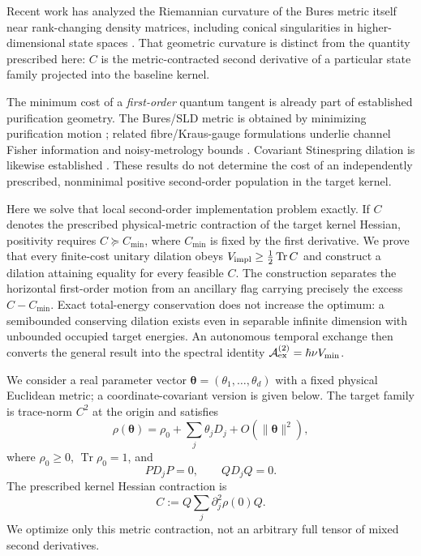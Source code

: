 \documentclass[aps,pra,preprint,nofootinbib]{revtex4-2}
\newcommand{\Tr}{\operatorname{Tr}}
\newcommand{\rhozero}{\rho_0}
\newcommand{\Cker}{C}
\begin{document}
Recent work has analyzed the Riemannian curvature of the Bures metric itself near rank-changing density matrices, including conical singularities in higher-dimensional state spaces \cite{HuangEtAl2026}. That geometric curvature is distinct from the quantity prescribed here: $C$ is the metric-contracted second derivative of a particular state family projected into the baseline kernel.

The minimum cost of a \emph{first-order} quantum tangent is already part of established purification geometry. The Bures/SLD metric is obtained by minimizing purification motion \cite{BraunsteinCaves1994}; related fibre/Kraus-gauge formulations underlie channel Fisher information and noisy-metrology bounds \cite{FujiwaraImai2008,EscherEtAl2011,DemkowiczKolodynskiGuta2012}. Covariant Stinespring dilation is likewise established \cite{Scutaru1979}. These results do not determine the cost of an independently prescribed, nonminimal positive second-order population in the target kernel.

Here we solve that local second-order implementation problem exactly. If $C$ denotes the prescribed physical-metric contraction of the target kernel Hessian, positivity requires $C\succeq C_{\min}$, where $C_{\min}$ is fixed by the first derivative. We prove that every finite-cost unitary dilation obeys $V_{\rm impl}\ge\tfrac12\Tr C$ and construct a dilation attaining equality for every feasible $C$. The construction separates the horizontal first-order motion from an ancillary flag carrying precisely the excess $C-C_{\min}$. Exact total-energy conservation does not increase the optimum: a semibounded conserving dilation exists even in separable infinite dimension with unbounded occupied target energies. An autonomous temporal exchange then converts the general result into the spectral identity $\mathcal A_{\rm ex}^{(2)}=\hbar\nu V_{\min}$.

We consider a real parameter vector $\bm\theta=(\theta_1,\ldots,\theta_d)$ with a fixed physical Euclidean metric; a coordinate-covariant version is given below. The target family is trace-norm $C^2$ at the origin and satisfies
\begin{equation}
 \rho(\bm\theta)=\rhozero+\sum_j \theta_j D_j+O(\|\bm\theta\|^2),
\end{equation}
where $\rhozero\ge0$, $\Tr\rhozero=1$, and
\begin{equation}
 P D_jP=0,\qquad QD_jQ=0.
 \label{eq:pureboundary}
\end{equation}
The prescribed kernel Hessian contraction is
\begin{equation}
 \Cker:=Q\sum_j \partial_j^2\rho(0)Q.
 \label{eq:Cdef}
\end{equation}
We optimize only this metric contraction, not an arbitrary full tensor of mixed second derivatives.
\end{document}
